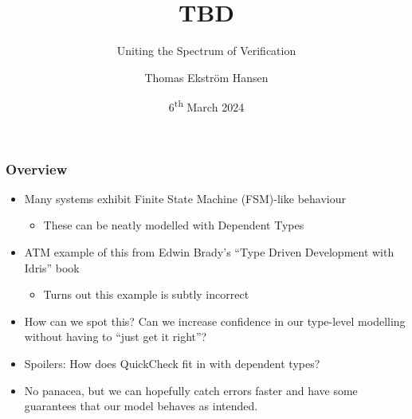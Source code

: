 \documentclass[compress,handout]{beamer}
\title{TBD}
\subtitle{Uniting the Spectrum of Verification}
\author{Thomas Ekstr{\" o}m Hansen}
\date{6\textsuperscript{th} March 2024}
\begin{document}
\maketitle


\begin{frame}
  \frametitle{Overview}

  \begin{itemize}
    \item<1-> Many systems exhibit Finite State Machine (FSM)-like behaviour
    \begin{itemize}
      \item<1-> These can be neatly modelled with Dependent Types
    \end{itemize}
    \item<2-> ATM example of this from Edwin Brady's ``Type Driven
              Development with Idris'' book
    \begin{itemize}
      \item<2-> Turns out this example is subtly incorrect
    \end{itemize}
    \item<3-> How can we spot this? Can we increase confidence in our type-level
              modelling without having to ``just get it right''?
    \item<4-> Spoilers: How does QuickCheck fit in with dependent types?
    \item<5-> No panacea, but we can hopefully catch errors faster and have some
              guarantees that our model behaves as intended.
  \end{itemize}

\end{frame}
\end{document}
